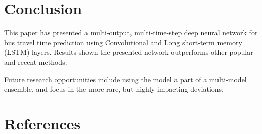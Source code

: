 \documentclass[preprint,11pt,5p,twocolumn]{elsarticle}
\begin{document}
\clearpage

\section{Conclusion}
\label{sec:conclusion}
This paper has presented a multi-output, multi-time-step deep neural network for bus travel time prediction using Convolutional and Long short-term memory (LSTM) layers. Results shown the presented network outperforms other popular and recent methods.

Future research opportunities include using the model a part of a multi-model ensemble, and focus in the more rare, but highly impacting deviations.

\section*{References}

%

\end{document}
